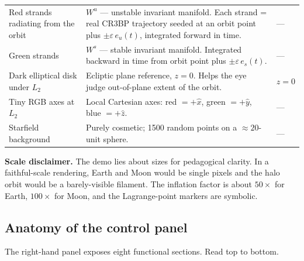 \documentclass[11pt,a4paper]{article}
\begin{document}
\begin{table}[H]
\begin{tabularx}{\textwidth}{@{}l X l@{}}
Red strands radiating from the orbit & $W^u$ --- unstable invariant manifold. Each strand = real CR3BP trajectory seeded at an orbit point plus $\pm\varepsilon\,e_u(t)$, integrated forward in time. & --- \\
Green strands & $W^s$ --- stable invariant manifold. Integrated backward in time from orbit point plus $\pm\varepsilon\,e_s(t)$. & --- \\
Dark elliptical disk under $L_2$ & Ecliptic plane reference, $z=0$. Helps the eye judge out-of-plane extent of the orbit. & $z = 0$ \\
Tiny RGB axes at $L_2$ & Local Cartesian axes: red $= +\hat x$, green $= +\hat y$, blue $= +\hat z$. & --- \\
Starfield background & Purely cosmetic; 1500 random points on a $\approx 20$-unit sphere. & --- \\
\bottomrule
\end{tabularx}
\end{table}

\textbf{Scale disclaimer.} The demo lies about sizes for pedagogical clarity. In a faithful-scale rendering, Earth and Moon would be single pixels and the halo orbit would be a barely-visible filament. The inflation factor is about $50\times$ for Earth, $100\times$ for Moon, and the Lagrange-point markers are symbolic.

\subsection{Anatomy of the control panel}\label{sec:demo:panel}

The right-hand panel exposes eight functional sections. Read top to bottom.
\end{document}
